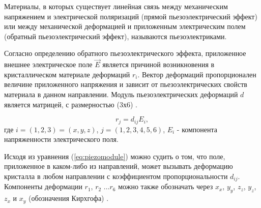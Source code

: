 \label{sec:piezo_theor}
Материалы, в которых  существует линейная связь между механическим напряжением
и электрической поляризаций (прямой пьезоэлектрический эффект) или между
механической деформацией и приложенным электрическим полем
(обратный пьезоэлектрический эффект), называются пьезоэлектриками.
%

Согласно определению обратного пьезоэлектрического эффекта,
приложенное внешнее электрическое поле $\vec{E}$ является причиной возникновения
в кристаллическом материале деформаций $r_i$. Вектор деформаций пропорционален
величине приложенного напряжения и зависит от пьезоэлектрических свойств материала
в данном направлении. Модуль пьезоэлектрических деформаций $d$ является матрицей,
 с размерностью (3х6) \cite{kedi_1949,Newnham_2005}.

\begin{equation}
  r_j = d_{ij}E_i,
  \label{eq:piezomodule}
\end{equation}
где $i = (1,2,3) = (x,y,z)$, $j = (1,2,3,4,5,6)$, $E_i$ - компонента напряженности электрического поля.

Исходя из уравнения (\ref{eq:piezomodule}) можно судить о том, что поле, приложенное в каком-либо из
направлений, может вызывать деформацию кристалла в любом направлении с коэффициентом пропорциональности $d_{ij}$.
Компоненты деформации  $r_1$, $r_2$ ...$r_6$ можно также обозначать через $x_x$, $y_y$, $z_z$,
$y_z$, $z_x$ и $x_y$ (обозначения Кирхгофа)  \cite{kedi_1949}.

